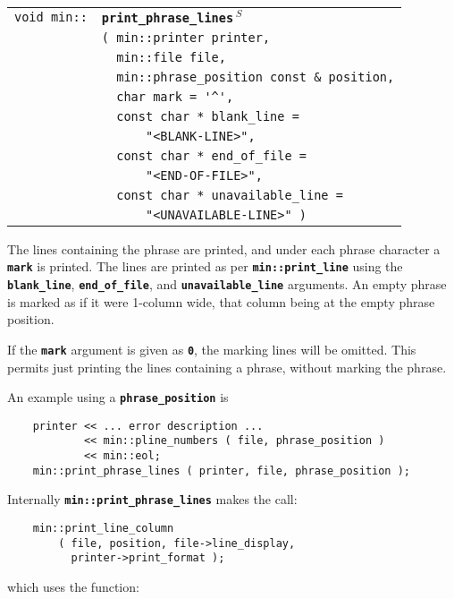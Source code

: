 \documentclass[12pt]{article}
\makeatletter
\newcommand{\TT}[1]{{\tt \bfseries #1}}
\newcommand{\ttindex}[1]{\index{#1@{\tt #1}}}
\newcommand{\EOL}{\penalty \exhyphenpenalty}
\newenvironment{indpar}[1][0.3in]%
	{\begin{list}{}%
		     {\setlength{\itemsep}{0in}%
		      \setlength{\topsep}{0in}%
		      \setlength{\parsep}{1ex}%
		      \setlength{\labelwidth}{#1}%
		      \setlength{\leftmargin}{#1}%
		      \addtolength{\leftmargin}{\labelsep}}%
	 \item}%
	{\end{list}}
\newcommand{\LABEL}[1]{\label{#1}}
\newlength{\ARGBREAKLENGTH}
\newcommand{\ARGBREAK}[1][\ARGBREAKLENGTH]{\\&\hspace*{#1}}
\newcommand{\MINKEY}[1]%
	   {\TT{#1}\ttindex{min::#1}\ttindex{#1}}
\newcommand{\RESIZE}{$\,^S$}
\makeatother
\begin{document}
\begin{indpar}[1em]\begin{tabular}{r@{}l}
\verb|void min::|
    & \MINKEY{print\_\EOL phrase\_\EOL lines\RESIZE}\ARGBREAK
      \verb|( min::printer printer,|\ARGBREAK
      \verb|  min::file file,|\ARGBREAK
      \verb|  min::phrase_position const & position,|\ARGBREAK
      \verb|  char mark = '^',|\ARGBREAK
      \verb|  const char * blank_line =|\ARGBREAK
      \verb|      "<BLANK-LINE>",|\ARGBREAK
      \verb|  const char * end_of_file =|\ARGBREAK
      \verb|      "<END-OF-FILE>",|\ARGBREAK
      \verb|  const char * unavailable_line =|\ARGBREAK
      \verb|      "<UNAVAILABLE-LINE>" )|
\LABEL{MIN::PRINT_PHRASE_LINES} \\
\end{tabular}\end{indpar}

The lines containing the phrase are printed, and under each phrase
character a \TT{mark} is printed.  The lines are printed
as per \TT{min::\EOL print\_\EOL line} using the
\TT{blank\_\EOL line},
\TT{end\_\EOL of\_\EOL file}, and
\TT{unavailable\_\EOL line} arguments.
An empty phrase is marked as if it were 1-column wide, that column
being at the empty phrase position.

If the \TT{mark} argument is given as \TT{0}, the marking lines
will be omitted.  This permits just printing the lines containing
a phrase, without marking the phrase.

An example using a \TT{phrase\_position} is

\begin{indpar}\begin{verbatim}
    printer << ... error description ...
            << min::pline_numbers ( file, phrase_position )
            << min::eol;
    min::print_phrase_lines ( printer, file, phrase_position );
\end{verbatim}\end{indpar}

Internally \TT{min::\EOL print\_\EOL phrase\_\EOL lines}
makes the call:

\begin{indpar}\begin{verbatim}
    min::print_line_column
        ( file, position, file->line_display,
          printer->print_format );
\end{verbatim}\end{indpar}

which uses the function:
\end{document}
